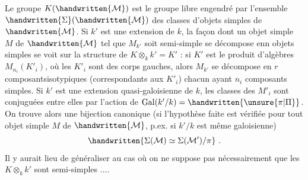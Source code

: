 Le groupe $K(\handwritten{\mathcal{M}})$ est le groupe libre engendré par l'ensemble $\handwritten{\Sigma}(\handwritten{\mathcal{M}})$ des classes d'objets simples de $\handwritten{\mathcal{M}}$. Si $k'$ est une extension de $k$, la façon dont un objet simple $M$ de $\handwritten{\mathcal{M}}$ tel que $M_{k'}$ soit semi-simple se décompose enn objets simples se voit sur la structure de $K\otimes_k k'=K'$ : si $K'$ est le produit d'algèbres $M_{n_i}(K'_i)$, où les $K'_i$ sont des corps gauches, alors $M_{k'}$ se décompose en $r$ composantsisotypiques (correspondants aux $K'_i$) chacun ayant $n_i$ composants simples. Si $k'$ est une extension quasi-galoisienne de $k$, les classes des $M'_i$ sont conjuguées entre elles par l'action de $\operatorname{Gal}(k'/k)=\handwritten{\unsure{\pi|\Pi}}$. On trouve alors une bijection canonique (si l'hypothèse faite est vérifiée pour tout objet simple  $M$ de $\handwritten{\mathcal{M}}$, p.ex. si $k'/k$ est même galoisienne)
\[
\handwritten{\Sigma(\mathcal{M})\simeq\Sigma(\mathcal{M}')/\pi}\ .
\]
Il y aurait lieu de généraliser au cas où on ne suppose pas nécessairement que les $K\otimes_k k'$ sont semi-simples ....

